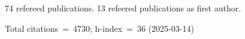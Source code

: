 74 refereed publications. 13 refeered publications as first author.

Total citations~=~4730; h-index~=~36 (2025-03-14)